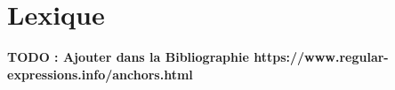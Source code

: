 \documentclass[
    iict, %
    il, %
]{heig-tb}
\begin{document}
\chapter{Lexique}




\textbf{TODO : Ajouter dans la Bibliographie https://www.regular-expressions.info/anchors.html}
\printbibliography
{}
\end{document}
